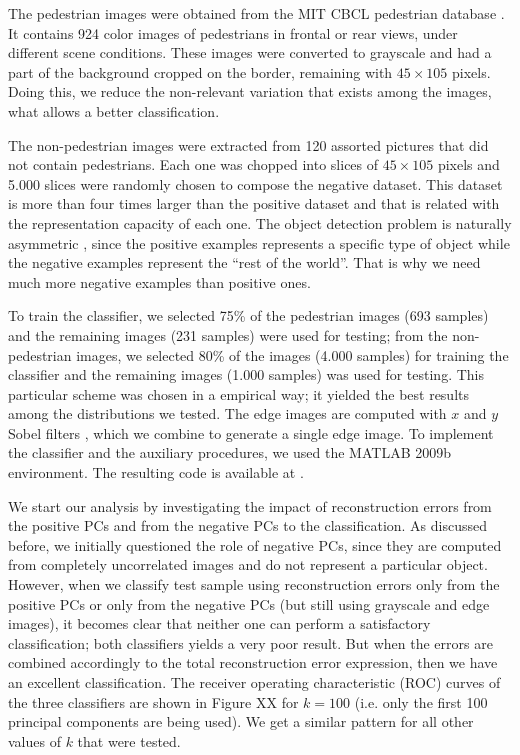 \documentclass[10pt, conference, compsocconf]{IEEEtran}
\begin{document}
The pedestrian images were obtained from the MIT CBCL pedestrian database \cite{cbcl}. It contains 924 color images of pedestrians in frontal or rear views, under different scene conditions. These images were converted to grayscale and had a part of the background cropped on the border, remaining with $45 \times 105$ pixels. Doing this, we reduce the non-relevant variation that exists among the images, what allows a better classification.

The non-pedestrian images were extracted from 120 assorted pictures that did not contain pedestrians. Each one was chopped into slices of $45 \times 105$ pixels and 5.000 slices were randomly chosen to compose the negative dataset. This dataset is more than four times larger than the positive dataset and that is related with the representation capacity of each one. The object detection problem is naturally asymmetric \cite{jiang09}, since the positive examples represents a specific type of object while the negative examples represent the ``rest of the world''. That is why we need much more negative examples than positive ones.

To train the classifier, we selected 75\% of the pedestrian images (693 samples) and the remaining images (231 samples) were used  for testing; from the non-pedestrian images, we selected 80\% of the images (4.000 samples) for training the classifier and the remaining images (1.000 samples) was used for testing. This particular scheme was chosen in a empirical way; it yielded the best results among the distributions we tested. The edge images are computed with $x$ and $y$ Sobel filters \cite{gonzalez01}, which we combine to generate a single edge image. To implement the classifier and the auxiliary procedures, we used the MATLAB 2009b environment. The resulting code is available at \cite{code}.

We start our analysis by investigating the impact of reconstruction errors from the positive PCs and from the negative PCs to the classification. As discussed before, we initially questioned the role of negative PCs, since they are computed from completely uncorrelated images and do not represent a particular object. However, when we classify test sample using reconstruction errors only from the positive PCs or only from the negative PCs (but still using grayscale and edge images), it becomes clear that neither one can perform a satisfactory classification; both classifiers yields a very poor result. But when the errors are combined accordingly to the total reconstruction error expression, then we have an excellent classification. The receiver operating characteristic (ROC) curves of the three classifiers are shown in Figure XX for $k = 100$ (i.e. only the first 100 principal components are being used). We get a similar pattern for all other values of $k$ that were tested.
\end{document}
